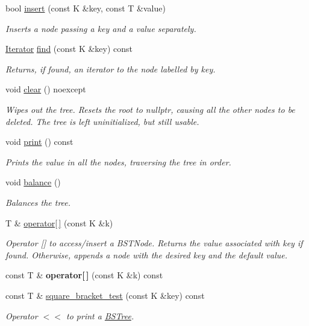 \begin{DoxyCompactItemize}
bool \hyperlink{class_b_s_tree_a00ca543914dbdaa89b9c9f6fae7d6555}{insert} (const K \&key, const T \&value)
\begin{DoxyCompactList}\small\item\em Inserts a node passing a key and a value separately. \end{DoxyCompactList}\item 
\hyperlink{class_b_s_tree_1_1_iterator}{Iterator} \hyperlink{class_b_s_tree_a739cf62b2b972cd063928357dd2aba9a}{find} (const K \&key) const
\begin{DoxyCompactList}\small\item\em Returns, if found, an iterator to the node labelled by key. \end{DoxyCompactList}\item 
void \hyperlink{class_b_s_tree_ae5362c45ed2bc96c9c72fdef689bd078}{clear} () noexcept
\begin{DoxyCompactList}\small\item\em Wipes out the tree. Resets the root to nullptr, causing all the other nodes to be deleted. The tree is left uninitialized, but still usable. \end{DoxyCompactList}\item 
void \hyperlink{class_b_s_tree_a468dcc29b6786ddc5de05c314d644ce1}{print} () const
\begin{DoxyCompactList}\small\item\em Prints the value in all the nodes, traversing the tree in order. \end{DoxyCompactList}\item 
void \hyperlink{class_b_s_tree_a955848e883b93312a467c0ee103db8df}{balance} ()
\begin{DoxyCompactList}\small\item\em Balances the tree. \end{DoxyCompactList}\item 
T \& \hyperlink{class_b_s_tree_adb6e522a0dbbedd33ad21724b4dca0f6}{operator\mbox{[}$\,$\mbox{]}} (const K \&k)
\begin{DoxyCompactList}\small\item\em Operator \mbox{[}\mbox{]} to access/insert a B\+S\+T\+Node. Returns the value associated with key if found. Otherwise, appends a node with the desired key and the default value. \end{DoxyCompactList}\item 
\mbox{\label{class_b_s_tree_a265ffc422b631fee4e51531db590a957}} 
const T \& {\bfseries operator\mbox{[}$\,$\mbox{]}} (const K \&k) const
\item 
const T \& \hyperlink{class_b_s_tree_a8b5a7600d91dee310ece37c10cbceb6a}{square\+\_\+bracket\+\_\+test} (const K \&key) const
\begin{DoxyCompactList}\small\item\em Operator $<$$<$ to print a \hyperlink{class_b_s_tree}{B\+S\+Tree}. \end{DoxyCompactList}\end{DoxyCompactItemize}
